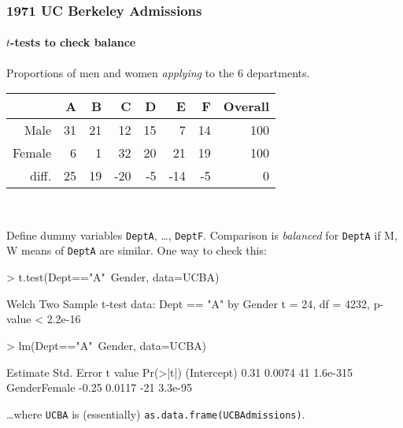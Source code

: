 \begin{frame}[fragile,label=UCBAttestFr] 
  \frametitle{1971 UC Berkeley Admissions}
  \framesubtitle{$t$-tests to check balance}

\bigskip

Proportions of men and women \textit{applying} to the 6 departments.\\
\begin{tabular}{rrrrrrrr}
  \hline
 & A & B & C & D & E & F & Overall \\ 
  \hline
Male & 31 & 21 & 12 & 15 & 7 & 14 & 100 \\ 
  Female & 6 & 1 & 32 & 20 & 21 & 19 & 100 \\ 
  diff. & 25 & 19 & -20 & -5 & -14 & -5 & 0 \\ 
   \hline
\end{tabular}\\
\bigskip


Define dummy variables \texttt{DeptA}, \ldots, \texttt{DeptF}. Comparison is \textit{balanced} for \texttt{DeptA} if M, W means of \texttt{DeptA} are similar. One way to check this:\\
\begin{Schunk}
\begin{Sinput}
> t.test(Dept=="A"~Gender, data=UCBA)
\end{Sinput}
\end{Schunk}
\begin{Schunk}
\begin{Soutput}
	Welch Two Sample t-test
data:  Dept == "A" by Gender 
t = 24, df = 4232, p-value < 2.2e-16    
\end{Soutput}
\end{Schunk}
\begin{Schunk}
\begin{Sinput}
> lm(Dept=="A"~Gender, data=UCBA)
\end{Sinput}
\end{Schunk}
\begin{Schunk}
\begin{Soutput}
             Estimate Std. Error t value Pr(>|t|)
(Intercept)      0.31     0.0074      41 1.6e-315
GenderFemale    -0.25     0.0117     -21  3.3e-95
\end{Soutput}
\end{Schunk}


\vfill
{\footnotesize \ldots where \texttt{UCBA} is (essentially)
  \texttt{as.data.frame(UCBAdmissions)}.}
\mbox{ }

\end{frame}



